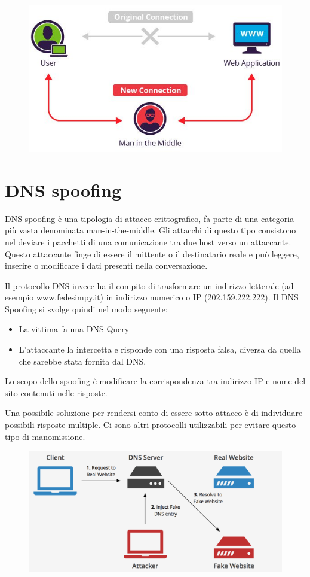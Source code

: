 \begin{figure}[H]
\centering
\includegraphics[scale=0.6]{res/img/64_MITM.png}
\end{figure}

\section{DNS spoofing}

DNS spoofing è una tipologia di attacco crittografico, fa parte di una categoria più vasta denominata man-in-the-middle. Gli attacchi di questo tipo consistono nel deviare i pacchetti di una comunicazione tra due host verso un attaccante. Questo attaccante finge di essere il mittente o il destinatario reale e può leggere, inserire o modificare i dati presenti nella conversazione.

Il protocollo DNS invece ha il compito di trasformare un indirizzo letterale (ad esempio www.fedesimpy.it) in indirizzo numerico o IP (202.159.222.222).
Il DNS Spoofing si svolge quindi nel modo seguente: 
\begin{itemize}
\item	La vittima fa una DNS Query
\item	L’attaccante la intercetta e risponde con una risposta falsa, diversa da quella che sarebbe stata fornita dal DNS.
\end{itemize}
Lo scopo dello spoofing è modificare la corrispondenza tra indirizzo IP e nome del sito contenuti nelle risposte.

Una possibile soluzione per rendersi conto di essere sotto attacco è di individuare possibili risposte multiple. Ci sono altri protocolli utilizzabili per evitare questo tipo di manomissione.

\begin{figure}[H]
\centering
\includegraphics[scale=0.35]{res/img/65_DNSSpoofing.png}
\end{figure}
